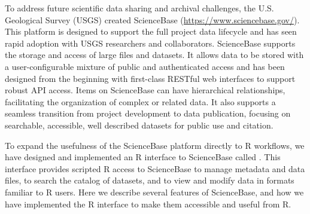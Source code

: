To address future scientific data sharing and archival challenges, the U.S. 
Geological Survey (USGS) created ScienceBase (\url{https://www.sciencebase.gov/}). 
This platform is designed to support the full project data lifecycle and has seen 
rapid adoption with USGS researchers and collaborators. ScienceBase supports the 
storage and access of large files and datasets. It allows data to be stored 
with a user-configurable mixture of 
public and authenticated access and has been designed from the beginning with
first-class RESTful web interfaces to support robust API access. Items on ScienceBase 
can have hierarchical relationships, facilitating the organization of complex or related
data. It also supports a seamless transition from project development to data publication, 
focusing on searchable, accessible, well described datasets for public use and citation.

To expand the usefulness of the ScienceBase platform directly to R workflows, 
we have designed and
implemented an R interface to ScienceBase called .
This interface provides scripted R access to ScienceBase to manage metadata and
data files, to search the catalog of datasets, and to view and modify data in
formats familiar to R users.
Here we describe several features of ScienceBase, and how we have
implemented the R interface to make them accessible and useful from R.
